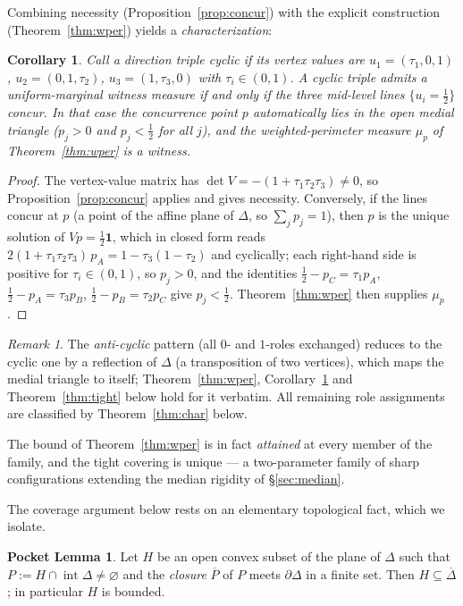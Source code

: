 \documentclass[11pt,reqno]{amsart}
\theoremstyle{plain}
\newtheorem{corollary}[theorem]{Corollary}
\theoremstyle{definition}
\newtheorem*{pocketlemma}{Pocket Lemma}
\theoremstyle{remark}
\newtheorem{remark}[theorem]{Remark}
\begin{document}
Combining necessity (Proposition~\ref{prop:concur}) with the explicit construction
(Theorem~\ref{thm:wper}) yields a \emph{characterization}:
\begin{corollary}\label{cor:iff}
Call a direction triple \emph{cyclic} if its vertex values are
$u_1=(\tau_1,0,1)$, $u_2=(0,1,\tau_2)$, $u_3=(1,\tau_3,0)$ with
$\tau_i\in(0,1)$. A cyclic triple admits a uniform-marginal witness measure if and
only if the three mid-level lines $\{u_i=\tfrac12\}$ concur. In that case the
concurrence point $p$ automatically lies in the open medial triangle
($p_j>0$ and $p_j<\tfrac12$ for all $j$), and the weighted-perimeter measure
$\mu_p$ of Theorem~\ref{thm:wper} is a witness.
\end{corollary}
\begin{proof}
The vertex-value matrix has $\det V=-(1+\tau_1\tau_2\tau_3)\ne0$, so
Proposition~\ref{prop:concur} applies and gives necessity. Conversely, if the lines
concur at $p$ (a point of the affine plane of $\Delta$, so $\sum_jp_j=1$), then $p$
is the unique solution of $Vp=\tfrac12\mathbf1$, which in closed form reads
$2(1+\tau_1\tau_2\tau_3)\,p_A=1-\tau_3(1-\tau_2)$ and cyclically; each right-hand
side is positive for $\tau_i\in(0,1)$, so $p_j>0$, and the identities
$\tfrac12-p_C=\tau_1p_A$, $\tfrac12-p_A=\tau_3p_B$, $\tfrac12-p_B=\tau_2p_C$ give
$p_j<\tfrac12$. Theorem~\ref{thm:wper} then supplies $\mu_p$.
\end{proof}
\begin{remark}
The \emph{anti-cyclic} pattern (all $0$- and $1$-roles exchanged) reduces to the
cyclic one by a reflection of $\Delta$ (a transposition of two vertices), which
maps the medial triangle to itself; Theorem~\ref{thm:wper},
Corollary~\ref{cor:iff} and Theorem~\ref{thm:tight} below hold for it verbatim.
All remaining role assignments are classified by Theorem~\ref{thm:char} below.
\end{remark}

The bound of Theorem~\ref{thm:wper} is in fact \emph{attained} at every member
of the family, and the tight covering is unique --- a two-parameter family of
sharp configurations extending the median rigidity of \S\ref{sec:median}.

The coverage argument below rests on an elementary topological fact, which we
isolate.

\begin{pocketlemma}
Let $H$ be an open convex subset of the plane of $\Delta$ such that
$P:=H\cap\operatorname{int}\Delta\ne\varnothing$ and the \emph{closure}
$\overline P$ of $P$ meets $\partial\Delta$ in a finite set. Then
$H\subseteq\overline\Delta$; in particular $H$ is bounded.
\end{pocketlemma}
\end{document}
